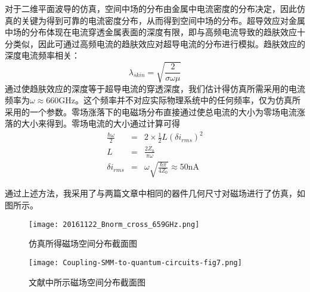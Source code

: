         对于二维平面波导的仿真，空间中场的分布由金属中电流密度的分布决定，因此仿真的关键为得到可靠的电流密度分布，从而得到空间中场的分布。超导效应对金属中场的分布体现在电流穿透金属表面的深度有限，即与高频电流导致的趋肤效应十分类似，因此可通过高频电流的趋肤效应对超导电流的分布进行模拟\cite{Mark2013}。趋肤效应的深度电流频率相关：
        \begin{equation}
            \lambda_{skin} = \sqrt{\frac{2}{\sigma \omega \mu}}
        \end{equation}
        通过使趋肤效应的深度等于超导电流的穿透深度，我们估计得仿真所需采用的电流频率为$ \omega \approx 660 $GHz。这个频率并不对应实际物理系统中的任何频率，仅为仿真所采用的一个参数。零场涨落下的电磁场分布直接通过使总电流的大小为零场电流涨落的大小来得到。零场电流的大小通过计算可得\cite{PhysRevA.95.022306,Mark2013,Tosi2014}
        \begin{eqnarray}
            \label{eqn:ZPF_estimation}
            \frac{\hbar \omega }{2} &=& 2\times \frac{1}{2}L (\delta i_{rms})^2\\
            L&=& \frac{2Z_0}{\pi \omega}\\
            \delta i_{rms } &=& \omega \sqrt{ \frac{\hbar \pi}{4Z_0} }\approx 50 \mathrm{nA}
        \end{eqnarray}
        
        通过上述方法，我采用了与两篇文章中相同的器件几何尺寸对磁场进行了仿真，如图所示。


        \begin{figure}
            \begin{minipage}[b]{0.4\textwidth}
                \centering
                \texttt{[image: 20161122\_Bnorm\_cross\_659GHz.png]}
                \caption{仿真所得磁场空间分布截面图}
                \label{fig:20161122_Bnorm_cross_659GHz}
            \end{minipage}%
            \hfill
            \begin{minipage}[b]{0.5\textwidth}
                \centering
                \texttt{[image: Coupling-SMM-to-quantum-circuits-fig7.png]}
                \caption{文献\cite{Mark2013}中所示磁场空间分布截面图}
                \label{fig:Coupling-SMM-to-quantum-circuits-fig7}
            \end{minipage}
        \end{figure}
        
